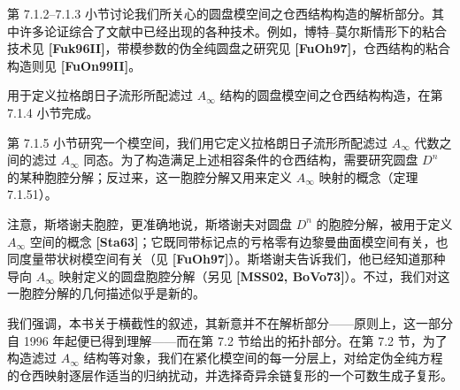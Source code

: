 第 7.1.2--7.1.3 小节讨论我们所关心的圆盘模空间之仓西结构构造的解析部分。其中许多论证综合了文献中已经出现的各种技术。例如，博特--莫尔斯情形下的粘合技术见 \textbf{[Fuk96II]}，带模参数的伪全纯圆盘之研究见 \textbf{[FuOh97]}，仓西结构的粘合构造则见 \textbf{[FuOn99II]}。

用于定义拉格朗日子流形所配滤过 $A_\infty$ 结构的圆盘模空间之仓西结构构造，在第 7.1.4 小节完成。

第 7.1.5 小节研究一个模空间，我们用它定义拉格朗日子流形所配滤过 $A_\infty$ 代数之间的滤过 $A_\infty$ 同态。为了构造满足上述相容条件的仓西结构，需要研究圆盘 $D^n$ 的某种胞腔分解；反过来，这一胞腔分解又用来定义 $A_\infty$ 映射的概念（定理 7.1.51）。

注意，斯塔谢夫胞腔，更准确地说，斯塔谢夫对圆盘 $D^n$ 的胞腔分解，被用于定义 $A_\infty$ 空间的概念 \textbf{[Sta63]}；它既同带标记点的亏格零有边黎曼曲面模空间有关，也同度量带状树模空间有关（见 \textbf{[FuOh97]}）。斯塔谢夫告诉我们，他已经知道那种导向 $A_\infty$ 映射定义的圆盘胞腔分解（另见 \textbf{[MSS02, BoVo73]}）。不过，我们对这一胞腔分解的几何描述似乎是新的。

我们强调，本书关于横截性的叙述，其新意并不在解析部分——原则上，这一部分自 1996 年起便已得到理解——而在第 7.2 节给出的拓扑部分。在第 7.2 节，为了构造滤过 $A_\infty$ 结构等对象，我们在紧化模空间的每一分层上，对给定伪全纯方程的仓西映射逐层作适当的归纳扰动，并选择奇异余链复形的一个可数生成子复形。

